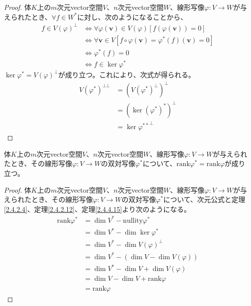 \documentclass[dvipdfmx]{jsarticle}
\begin{document}
\begin{proof}
体$K$上の$m$次元vector空間$V$、$n$次元vector空間$W$、線形写像$\varphi:V \rightarrow W$が与えられたとき、$\forall f \in W^{*}$に対し、次のようになることから、
\begin{align*}
f \in {V(\varphi)}^{\bot} &\Leftrightarrow \forall\varphi\left( \mathbf{v} \right) \in V(\varphi)\left[ f\left( \varphi\left( \mathbf{v} \right) \right) = 0 \right]\\
&\Leftrightarrow \forall\mathbf{v} \in V\left[ f \circ \varphi\left( \mathbf{v} \right) = \varphi^{*}(f)\left( \mathbf{v} \right) = 0 \right]\\
&\Leftrightarrow \varphi^{*}(f) = 0\\
&\Leftrightarrow f \in \ker\varphi^{*}
\end{align*}
$\ker\varphi^{*} = {V(\varphi)}^{\bot}$が成り立つ。これにより、次式が得られる。
\begin{align*}
{V\left( \varphi^{*} \right)}^{\bot\bot} &= \left( {V\left( \varphi^{*} \right)}^{\bot} \right)^{\bot}\\
&= \left( \ker\left( \varphi^{*} \right)^{*} \right)^{\bot}\\
&= {\ker\varphi^{**}}^{\bot}
\end{align*}
\end{proof}
\begin{thm}\label{2.4.4.16}
体$K$上の$m$次元vector空間$V$、$n$次元vector空間$W$、線形写像$\varphi:V \rightarrow W$が与えられたとき、その線形写像$\varphi:V \rightarrow W$の双対写像$\varphi^{*}$について、$\mathrm{rank} \varphi^{*} = \mathrm{rank} \varphi $が成り立つ。
\end{thm}
\begin{proof}
体$K$上の$m$次元vector空間$V$、$n$次元vector空間$W$、線形写像$\varphi:V \rightarrow W$が与えられたとき、その線形写像$\varphi:V \rightarrow W$の双対写像$\varphi^{*}$について、次元公式と定理\ref{2.4.2.4}、定理\ref{2.4.2.12}、定理\ref{2.4.4.15}より次のようになる。
\begin{align*}
\mathrm{rank} \varphi^{*} &= \dim V^{*} - \mathrm{nullity} \varphi^{*}\\
&= \dim V^{*} - \dim{\ker \varphi^{*}}\\
&= \dim V^{*} - \dim{V(\varphi)}^{\bot}\\
&= \dim V^{*} - \left( \dim V - \dim{V(\varphi)} \right)\\
&= \dim V^{*} - \dim V + \dim{V(\varphi)}\\
&= \dim V - \dim V + \mathrm{rank} \varphi \\
&= \mathrm{rank} \varphi 
\end{align*}
\end{proof}
\end{document}
